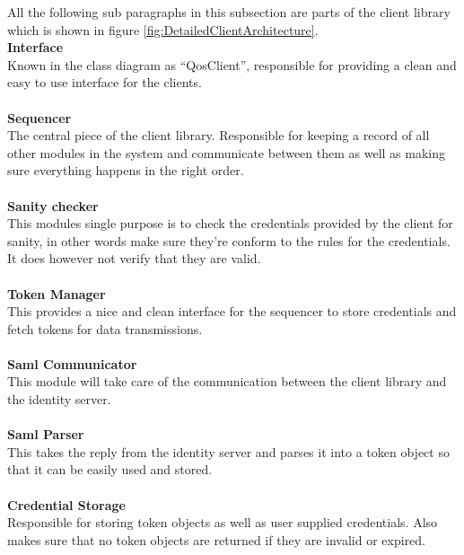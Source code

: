     All the following sub paragraphs in this subsection are parts of the client library which is shown in figure \ref{fig:DetailedClientArchitecture}.  \\ 
    
		\indent \textbf{Interface} \\
Known in the class diagram as “QosClient”, responsible for providing a clean and easy to use interface for the clients.
\\\\
		\indent \textbf{Sequencer} \\
The central piece of the client library. Responsible for keeping a record of all other modules in the system and communicate between them as well as making sure everything happens in the right order.
\\\\
		\indent \textbf{Sanity checker} \\
This modules single purpose is to check the credentials provided by the client for sanity, in other words make sure they're conform to the rules for the credentials. It does however not verify that they are valid.
\\\\
		\indent \textbf{Token Manager} \\
This provides a nice and clean interface for the sequencer to store credentials and fetch tokens for data transmissions.
\\\\
		\indent \textbf{Saml Communicator} \\
This module will take care of the communication between the client library and the identity server.
\\\\
		\indent \textbf{Saml Parser} \\
This takes the reply from the identity server and parses it into a token object so that it can be easily used and stored.
\\\\
		\indent \textbf{Credential Storage} \\
Responsible for storing token objects as well as user supplied credentials. Also makes sure that no token objects are returned if they are invalid or expired.

